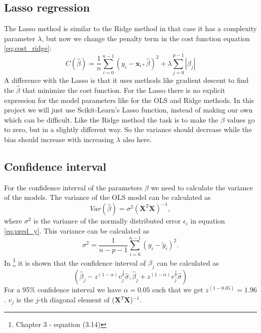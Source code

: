 \documentclass[12pt,a4paper,english]{article}
\begin{document}
\subsection{Lasso regression}
The Lasso method is similar to the Ridge method in that case it has a complexity parameter $\lambda$, but now we change the penalty term in the cost function equation \ref{eq:cost_ridge}:
\begin{equation}
\label{eq:cost_lasso}
C(\hat{\beta})=\frac{1}{n}\sum_{i=0}^{n-1}(y_i-\textbf{x}_{i*}\hat{\beta})^2+\lambda\sum_{j=0}^{p-1}|\beta_j|
\end{equation}
A difference with the Lasso is that it uses methods like gradient descent to find the $\hat{\beta}$ that minimize the cost function. For the Lasso there is no explicit expression for the model parameters like for the OLS and Ridge methods. In this project we will just use Scikit-Learn's Lasso function, instead of making our own which can be difficult. Like the Ridge method the task is to make the $\beta$ values go to zero, but in a slightly different way. So the variance should decrease while the bias should increase with increasing $\lambda$ also here.

\subsection{Confidence interval}
For the confidence interval of the parameters $\beta$ we need to calculate the variance of the models. The variance of the OLS model can be calculated as
\begin{equation}
\label{eq:var_ols}
Var(\hat{\beta})=\sigma^2(\textbf{X}^T\textbf{X})^{-1},
\end{equation}
where $\sigma^2$ is the variance of the normally distributed error $\epsilon_i$ in equation \ref{eq:pred_y}. This variance can be calculated as
\begin{equation}
\label{eq:sigma}
\sigma^2 = \frac{1}{n-p-1}\sum_{i=0}^{n-1}(y_i-\tilde{y}_i)^2.
\end{equation}
In \citet{hastie2009}\footnote{Chapter 3 - equation (3.14)} it is shown that the confidence interval of $\beta_j$ can be calculated as 
\begin{equation}
\label{eq:conf_int}
(\hat{\beta}_j-z^{(1-\alpha)}v_j^{\frac{1}{2}}\hat{\sigma}, \hat{\beta}_j+z^{(1-\alpha)}v_j^{\frac{1}{2}}\hat{\sigma})
\end{equation}
For a 95\% confidence interval we have $\alpha=0.05$ such that we get $z^{(1-0.05)}=1.96$. $v_j$ is the $j$-th diagonal element of (\textbf{X}$^T$\textbf{X})$^{-1}$.
\end{document}
